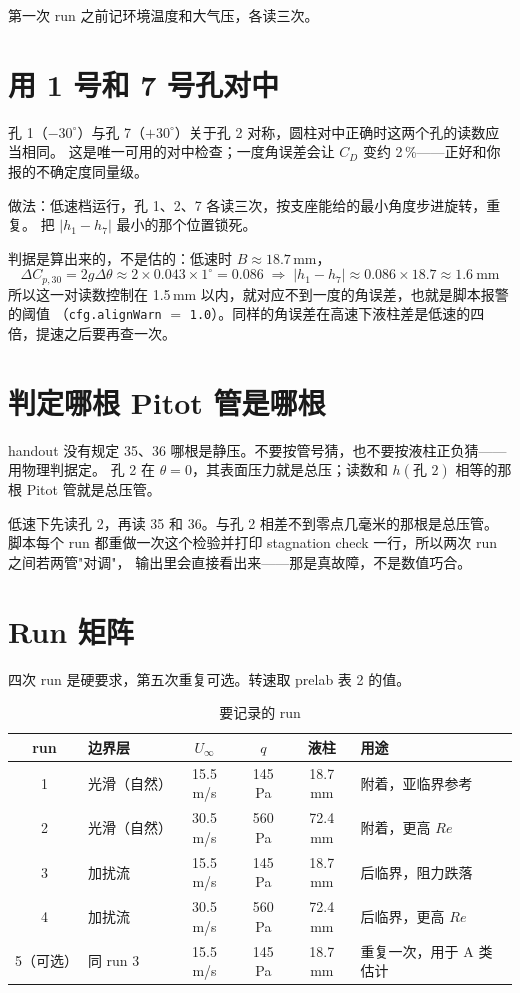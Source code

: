 \documentclass[11pt,a4paper]{ctexart}
\newcommand{\CD}{\ensuremath{C_D}}
\newcommand{\ReD}{\ensuremath{\mathit{Re}}}
\begin{document}
第一次 run 之前记环境温度和大气压，各读三次。

\section{用 1 号和 7 号孔对中}

孔 1（$-30^\circ$）与孔 7（$+30^\circ$）关于孔 2 对称，圆柱对中正确时这两个孔的读数应当相同。
这是唯一可用的对中检查；一度角误差会让 \CD{} 变约 2\,\%——正好和你报的不确定度同量级。

做法：低速档运行，孔 1、2、7 各读三次，按支座能给的最小角度步进旋转，重复。
把 $|h_1 - h_7|$ 最小的那个位置锁死。

判据是算出来的，不是估的：低速时 $B \approx 18.7$\,mm，
\begin{equation}
\Delta C_{p,30} = 2 g \Delta\theta \approx 2 \times 0.043 \times 1^\circ = 0.086
\;\Rightarrow\; |h_1 - h_7| \approx 0.086 \times 18.7 \approx 1.6\ \text{mm}
\end{equation}
所以这一对读数控制在 1.5\,mm 以内，就对应不到一度的角误差，也就是脚本报警的阈值
（\texttt{cfg.alignWarn} $=$ \texttt{1.0}）。同样的角误差在高速下液柱差是低速的四倍，提速之后要再查一次。

\section{判定哪根 Pitot 管是哪根}

handout 没有规定 35、36 哪根是静压。不要按管号猜，也不要按液柱正负猜——用物理判据定。
孔 2 在 $\theta = 0$，其表面压力就是总压；读数和 $h(\text{孔 }2)$ 相等的那根 Pitot 管就是总压管。

低速下先读孔 2，再读 35 和 36。与孔 2 相差不到零点几毫米的那根是总压管。
脚本每个 run 都重做一次这个检验并打印 stagnation check 一行，所以两次 run 之间若两管"对调"，
输出里会直接看出来——那是真故障，不是数值巧合。

\section{Run 矩阵}

四次 run 是硬要求，第五次重复可选。转速取 prelab 表 2 的值。

\begin{table}[H]
\centering
\caption{要记录的 run}
\small
\begin{tabular}{@{}c p{3.6cm} c c c p{5.0cm}@{}}
\toprule
run & 边界层 & $U_\infty$ & $q$ & 液柱 & 用途 \\
\midrule
1 & 光滑（自然） & 15.5 m/s & 145 Pa & 18.7 mm & 附着，亚临界参考 \\
2 & 光滑（自然） & 30.5 m/s & 560 Pa & 72.4 mm & 附着，更高 \ReD \\
3 & 加扰流 & 15.5 m/s & 145 Pa & 18.7 mm & 后临界，阻力跌落 \\
4 & 加扰流 & 30.5 m/s & 560 Pa & 72.4 mm & 后临界，更高 \ReD \\
5（可选） & 同 run 3 & 15.5 m/s & 145 Pa & 18.7 mm & 重复一次，用于 A 类估计 \\
\bottomrule
\end{tabular}
\end{table}
\end{document}
